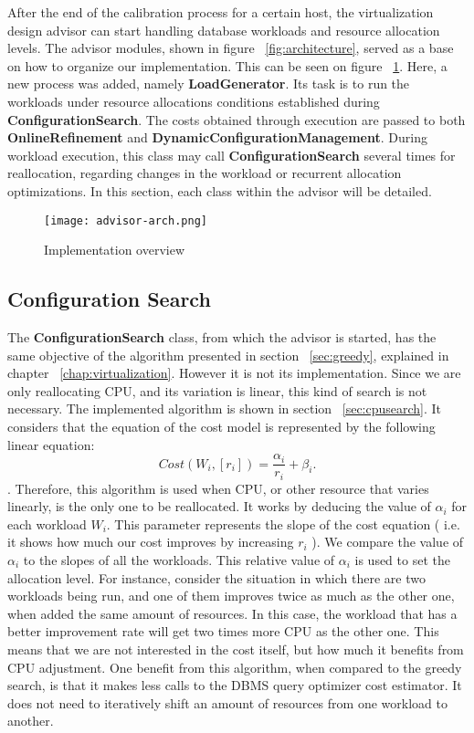 After the end of the calibration process for a certain host, the virtualization design advisor can start handling database workloads and resource allocation levels. The advisor modules, shown in figure ~\ref{fig:architecture}, served as a base on how to organize our implementation. This can be seen on figure ~\ref{fig:advisor}. Here, a new process was added, namely \textbf{LoadGenerator}.  Its task is to run the workloads under resource allocations conditions established during \textbf{ConfigurationSearch}. The costs obtained through execution are passed to both \textbf{OnlineRefinement} and \textbf{DynamicConfigurationManagement}. During workload execution, this class may call \textbf{ConfigurationSearch} several times for reallocation, regarding changes in the workload or recurrent allocation optimizations. In this section, each class within the advisor will be detailed.


\begin{figure}[ht]
\centering
\texttt{[image: advisor-arch.png]}
\caption{Implementation overview}
\label{fig:advisor}
\end{figure} 

\subsection{Configuration Search}

The \textbf{ConfigurationSearch} class, from which the advisor is started,  has the same objective of the algorithm presented in section ~\ref{sec:greedy}, explained in chapter  ~\ref{chap:virtualization}. However it is not its implementation. Since we are only reallocating CPU, and its variation is linear, this kind of search is not necessary. The implemented algorithm is shown in section ~\ref{sec:cpusearch}. It considers that the equation of the cost model is represented by the following linear equation:
\[
 Cost(W_{i}, [r_{i}]) = \frac{\alpha_{i}}{r_{i}} +\beta_{i}.
\].
Therefore, this algorithm is used when CPU, or other resource that varies linearly, is the only one to be reallocated. It works by deducing the value of $\alpha_{i}$ for each workload $W_{i}$. This parameter represents the slope of the cost equation ( i.e. it shows how much our cost improves by increasing $r_{i}$ ). We compare the  value of $\alpha_{i}$ to the slopes of all the workloads. This relative value of $\alpha_{i}$ is used to set the allocation level. For instance, consider the situation in which there are two workloads being run, and one of them improves twice as much as the other one, when added the same amount of resources. In this case, the workload that has a better improvement rate will get two times more CPU as the other one. This means that we are not interested in the cost itself, but how much it benefits from CPU adjustment. One benefit from this algorithm, when compared to the greedy search, is that it makes less calls to the DBMS query optimizer cost estimator. It does not need to iteratively shift an amount of resources from one workload to another.


